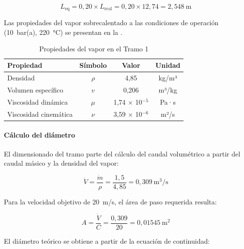 \begin{equation}
	L_{\text{eq}} = 0{,}20 \times L_{\text{real}} = 0{,}20 \times 12{,}74 = 2{,}548 \ \text{m}
	\label{eq:Leq-tramo1}
\end{equation}

Las propiedades del vapor sobrecalentado a las condiciones de operación (10~bar(a), 220~°C) se presentan en la .

\begin{table}[H]
	\centering
	\caption{Propiedades del vapor en el Tramo 1}
	\label{tab:propiedades-vapor-tramo1}
	\begin{tabular}{lccc}
		\toprule
		\textbf{Propiedad}    & \textbf{Símbolo} & \textbf{Valor}          & \textbf{Unidad} \\
		\midrule
		Densidad              & $\rho$           & 4,85                    & kg/m³           \\
		Volumen específico    & $v$              & 0,206                   & m³/kg           \\
		Viscosidad dinámica   & $\mu$            & 1,74 $\times$ 10$^{-5}$ & Pa·s            \\
		Viscosidad cinemática & $\nu$            & 3,59 $\times$ 10$^{-6}$ & m²/s            \\
		\bottomrule
	\end{tabular}
\end{table}

\paragraph{Cálculo del diámetro}

El dimensionado del tramo parte del cálculo del caudal volumétrico a partir del caudal másico y la densidad del vapor:

\begin{equation}
	\dot{V} = \frac{\dot{m}}{\rho} = \frac{1{,}5}{4{,}85} = 0{,}309 \ \text{m}^3\text{/s}
	\label{eq:caudal-volumetrico-tramo1}
\end{equation}

Para la velocidad objetivo de 20~m/s, el área de paso requerida resulta:

\begin{equation}
	A = \frac{\dot{V}}{C} = \frac{0{,}309}{20} = 0{,}01545 \ \text{m}^2
	\label{eq:area-paso-tramo1}
\end{equation}

El diámetro teórico se obtiene a partir de la ecuación de continuidad:

